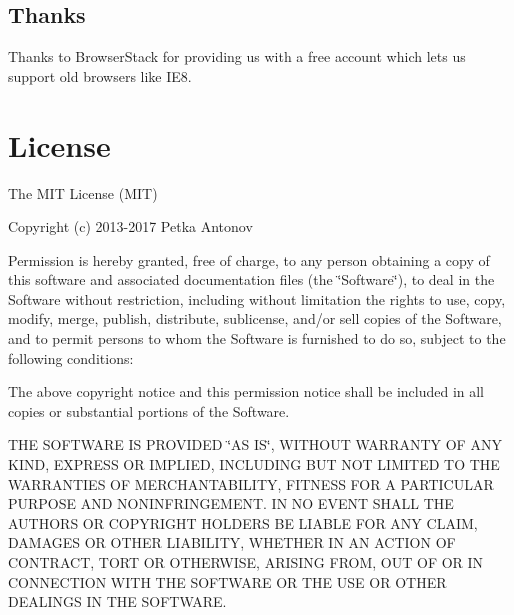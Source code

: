 \subsection*{Thanks}

Thanks to Browser\+Stack for providing us with a free account which lets us support old browsers like I\+E8.

\section*{License}

The M\+IT License (M\+IT)

Copyright (c) 2013-\/2017 Petka Antonov

Permission is hereby granted, free of charge, to any person obtaining a copy of this software and associated documentation files (the \char`\"{}\+Software\char`\"{}), to deal in the Software without restriction, including without limitation the rights to use, copy, modify, merge, publish, distribute, sublicense, and/or sell copies of the Software, and to permit persons to whom the Software is furnished to do so, subject to the following conditions\+:

The above copyright notice and this permission notice shall be included in all copies or substantial portions of the Software.

T\+HE S\+O\+F\+T\+W\+A\+RE IS P\+R\+O\+V\+I\+D\+ED \char`\"{}\+A\+S I\+S\char`\"{}, W\+I\+T\+H\+O\+UT W\+A\+R\+R\+A\+N\+TY OF A\+NY K\+I\+ND, E\+X\+P\+R\+E\+SS OR I\+M\+P\+L\+I\+ED, I\+N\+C\+L\+U\+D\+I\+NG B\+UT N\+OT L\+I\+M\+I\+T\+ED TO T\+HE W\+A\+R\+R\+A\+N\+T\+I\+ES OF M\+E\+R\+C\+H\+A\+N\+T\+A\+B\+I\+L\+I\+TY, F\+I\+T\+N\+E\+SS F\+OR A P\+A\+R\+T\+I\+C\+U\+L\+AR P\+U\+R\+P\+O\+SE A\+ND N\+O\+N\+I\+N\+F\+R\+I\+N\+G\+E\+M\+E\+NT. IN NO E\+V\+E\+NT S\+H\+A\+LL T\+HE A\+U\+T\+H\+O\+RS OR C\+O\+P\+Y\+R\+I\+G\+HT H\+O\+L\+D\+E\+RS BE L\+I\+A\+B\+LE F\+OR A\+NY C\+L\+A\+IM, D\+A\+M\+A\+G\+ES OR O\+T\+H\+ER L\+I\+A\+B\+I\+L\+I\+TY, W\+H\+E\+T\+H\+ER IN AN A\+C\+T\+I\+ON OF C\+O\+N\+T\+R\+A\+CT, T\+O\+RT OR O\+T\+H\+E\+R\+W\+I\+SE, A\+R\+I\+S\+I\+NG F\+R\+OM, O\+UT OF OR IN C\+O\+N\+N\+E\+C\+T\+I\+ON W\+I\+TH T\+HE S\+O\+F\+T\+W\+A\+RE OR T\+HE U\+SE OR O\+T\+H\+ER D\+E\+A\+L\+I\+N\+GS IN T\+HE S\+O\+F\+T\+W\+A\+RE. 